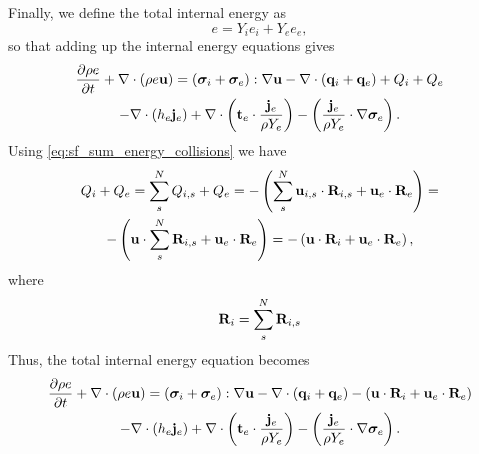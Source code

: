 \documentclass[a4paper,11pt]{report}
\begin{document}
Finally, we define the total internal energy as
\begin{equation}
    e = Y_i e_i + Y_e e_e,
\end{equation}
so that adding up the internal energy equations gives
\begin{multline*}
    \frac{\partial \rho e}{\partial t} + \nabla \cdot \left( \rho e \mathbf{u} \right) = \left( \bm \sigma_i + \bm \sigma_e \right): \nabla \mathbf{u} - \nabla \cdot \left( \mathbf{q}_i + \mathbf{q}_e \right) + Q_i + Q_e \\
    - \nabla \cdot \left( h_e \mathbf{j}_e \right) + \nabla \cdot \left( \mathbf{t}_e \cdot \frac{\mathbf{j}_e}{\rho Y_e} \right) - \left( \frac{\mathbf{j}_e}{\rho Y_e} \cdot \nabla \bm \sigma_e \right).
\end{multline*}
Using \cref{eq:sf_sum_energy_collisions} we have
\begin{multline*}
    Q_i + Q_e = \sum_s^N Q_{i,s} + Q_e = - \left( \sum_s^N \mathbf{u}_{i,s} \cdot \mathbf{R}_{i,s} + \mathbf{u}_e \cdot \mathbf{R}_e \right) = \\
    - \left( \mathbf{u} \cdot \sum_s^N \mathbf{R}_{i,s} + \mathbf{u}_e \cdot \mathbf{R}_e \right) = - \left( \mathbf{u} \cdot \mathbf{R}_i + \mathbf{u}_e \cdot \mathbf{R}_e \right),
\end{multline*}
where 
\begin{equation}
    \mathbf{R}_i = \sum_s^N \mathbf{R}_{i,s}
\end{equation}
Thus, the total internal energy equation becomes
\begin{multline*}
    \frac{\partial \rho e}{\partial t} + \nabla \cdot \left( \rho e \mathbf{u} \right) = \left( \bm \sigma_i + \bm \sigma_e \right): \nabla \mathbf{u} - \nabla \cdot \left( \mathbf{q}_i + \mathbf{q}_e \right) - \left( \mathbf{u} \cdot \mathbf{R}_i + \mathbf{u}_e \cdot \mathbf{R}_e \right) \\
    - \nabla \cdot \left( h_e \mathbf{j}_e \right) + \nabla \cdot \left( \mathbf{t}_e \cdot \frac{\mathbf{j}_e}{\rho Y_e} \right) - \left( \frac{\mathbf{j}_e}{\rho Y_e} \cdot \nabla \bm \sigma_e \right).
\end{multline*}

\end{document}
